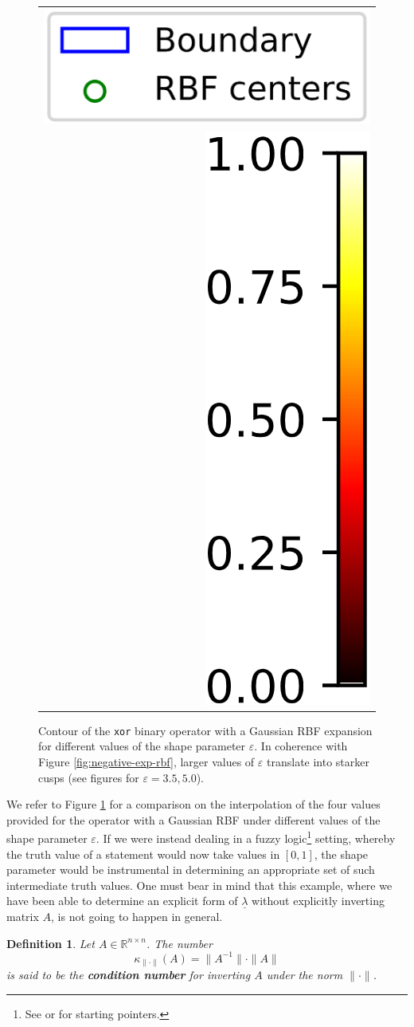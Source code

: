 \documentclass[12pt]{report} %
\newtheorem{definition}{Definition}
\newcommand{\tmstrong}[1]{\textbf{#1}}
\newcommand{\tmverbatim}[1]{\text{{\ttfamily{#1}}}}
\begin{document}
\begin{figure}[ht]
\begin{tabular}{ll}
  \end{tabular}
  \begin{tabular}{r}
    {\includegraphics[width=.24\textwidth, trim={0 -2cm 0 0}, clip=true]{imagenes/xor/Legend.png}}
    \\
    {\includegraphics[height=.4\textwidth]{imagenes/xor/Colorbar.png}}
  \end{tabular}
  \caption{Contour of the \texttt{xor} binary operator with a Gaussian RBF expansion for different values of the shape parameter $\varepsilon$. In coherence with Figure \ref{fig:negative-exp-rbf}, larger values of $\varepsilon$ translate into starker cusps (see figures for $\varepsilon=3.5,5.0$).}
  \label{fig:xor}
\end{figure}

We refer to Figure \ref{fig:xor} for a comparison on the interpolation of the
four values provided for the \tmverbatim{xor} operator with a Gaussian RBF
under different values of the shape parameter $\varepsilon$. If we were
instead dealing in a fuzzy logic\footnote{See {\cite{zadeh1988fuzzy}} or
    {\cite{russell2005ai}} for starting pointers.} setting, whereby the truth
value of a statement would now take values in $[0, 1]$, the shape parameter
would be instrumental in determining an appropriate set of such intermediate
truth values. One must bear in mind that this example, where we have been able
to determine an explicit form of $\underline{\lambda}$ without explicitly
inverting matrix $A$, is not going to happen in general.

\begin{definition}
  Let $A \in \mathbb{R}^{n \times n}$. The number
  \[ \kappa_{\| \cdot \|} (A) = \| A^{- 1} \| \cdot \| A \| \]
  is said to be the {\tmstrong{condition number}} for inverting $A$ under the
  norm $\| \cdot \|$.
\end{definition}
\end{document}

